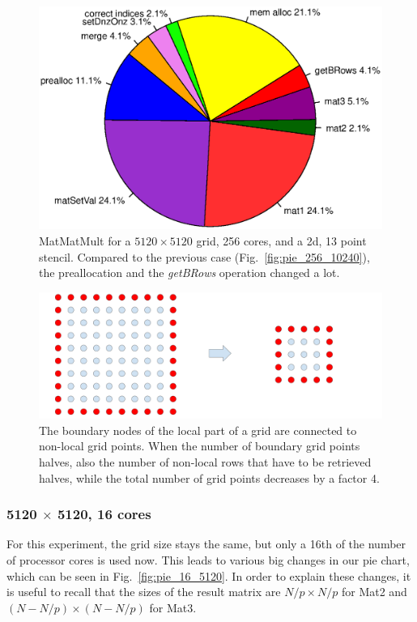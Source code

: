 \begin{figure}[tbp]
	\centering
	\includegraphics[width=1\textwidth, trim={0 3.cm 0 3cm},clip]{256cores_5120}
	\caption{MatMatMult for a $5120 \times 5120$ grid, 256 cores, and a 2d, 13 point stencil. Compared to the previous case (Fig.~\ref{fig:pie_256_10240}), the preallocation and the \textit{getBRows} operation changed a lot.} 
	\label{fig:pie_256_5120}
\end{figure}
\begin{figure}[tbp]
	\centering


	\includegraphics[width=1\textwidth]{4_large_small}
	\caption{The boundary nodes of the local part of a grid are connected to non-local grid points. When the number of boundary grid points halves, also the number of non-local rows that have to be retrieved halves, while the total number of grid points decreases by a factor 4.} 
	\label{fig:large_small}
\end{figure}

\subsubsection*{5120 $\times$ 5120, 16 cores}
For this experiment, the grid size stays the same, but only a 16th of the number of processor cores is used now. This leads to various big changes in our pie chart, which can be seen in Fig.~\ref{fig:pie_16_5120}. In order to explain these changes, it is useful to recall that the sizes of the result matrix are $N/p \times N/p$ for Mat2 and $(N-N/p) \times (N-N/p)$ for Mat3.

